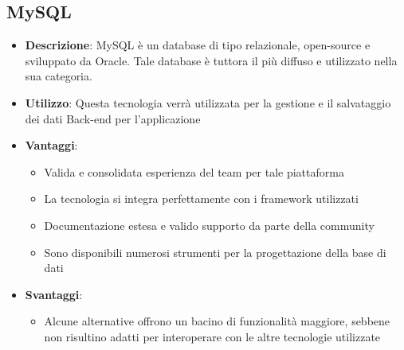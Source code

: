 \subsection{MySQL}
\begin{itemize}
	\item \textbf{Descrizione}: MySQL è un database di tipo relazionale, open-source e sviluppato da Oracle. Tale database è tuttora il più diffuso e utilizzato nella sua categoria.
	\item \textbf{Utilizzo}: Questa tecnologia verrà utilizzata per la gestione e il salvataggio dei dati Back-end per l'applicazione
	\item \textbf{Vantaggi}:
	\begin{itemize}
		\item Valida e consolidata esperienza del team per tale piattaforma
		\item La tecnologia si integra perfettamente con i framework utilizzati
		\item Documentazione estesa e valido supporto da parte della community
		\item Sono disponibili numerosi strumenti per la progettazione della base di dati
	\end{itemize}
	\item \textbf{Svantaggi}:
	\begin{itemize}
		\item Alcune alternative offrono un bacino di funzionalità maggiore, sebbene non risultino adatti per interoperare con le altre tecnologie utilizzate
	\end{itemize}
\end{itemize}



